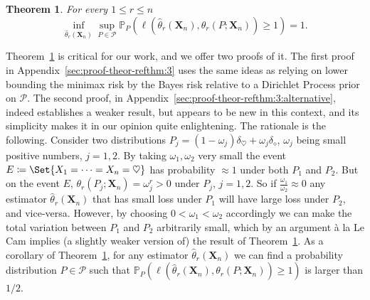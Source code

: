 \documentclass{article}
\newtheorem{theorem}{Theorem}
\newcommand{\1}{\boldsymbol{1}}
\newcommand{\PP}{\mathbb{P}}
\theoremstyle{plain}
\begin{document}
\begin{theorem}
  \label{thm:3}
  For every $1 \leq r \leq n$
  \begin{equation*}
    \inf_{\hat{\theta}_r(\mathbf{X}_{n})}\sup_{P\in \mathcal{P}}\PP_P\left( \ell(\hat{\theta}_r(\mathbf{X}_{n}),\theta_r(P;\mathbf{X}_{n})) \geq 1 \right) =1.
  \end{equation*}
\end{theorem}

Theorem~\ref{thm:3} is critical for our work, and we offer two proofs of it. The first proof in Appendix~\ref{sec:proof-theor-refthm:3} uses the same ideas as \cite{Fad(18)} relying on lower bounding the minimax risk by the Bayes risk relative to a Dirichlet Process prior on $\mathcal{P}$. The second proof, in Appendix~\ref{sec:proof-theor-refthm:3:alternative}, indeed establishes a weaker result, but appears to be new in this context, and its simplicity makes it in our opinion quite enlightening. The rationale is the following. Consider two distributions $P_j = (1- \omega_j)\delta_{\heartsuit} + \omega_j \delta_{\diamond}$, $\omega_j$ being small positive numbers, $j=1,2$. By taking $\omega_1,\omega_2$ very small the event $E \coloneqq \Set{X_1=\dots=X_n = \heartsuit}$ has probability $\approx 1$ under both $P_1$ and $P_2$. But on the event $E$, $\theta_r(P_j;\mathbf{X}_n) = \omega_j^r > 0$ under $P_j$, $j=1,2$. So if $\frac{\omega_1}{\omega_2} \approx 0$ any estimator $\hat{\theta}_r(\mathbf{X}_n)$ that has small loss under $P_1$ will have large loss under $P_2$, and vice-versa. However, by choosing $0 < \omega_1 < \omega_2$ accordingly we can make the total variation between $P_1$ and $P_2$ arbitrarily small, which by an argument à la Le Cam implies (a slightly weaker version of) the result of Theorem~\ref{thm:3}. As a corollary of Theorem~\ref{thm:3}, for any estimator $\hat{\theta}_r(\mathbf{X}_{n})$ we can find a probability distribution $P\in \mathcal{P}$ such that $\PP_P\left(\ell(\hat{\theta}_r(\mathbf{X}_{n}),\theta_r(P;\mathbf{X}_{n})) \geq 1 \right)$ is larger than $1/2$. 
\end{document}
